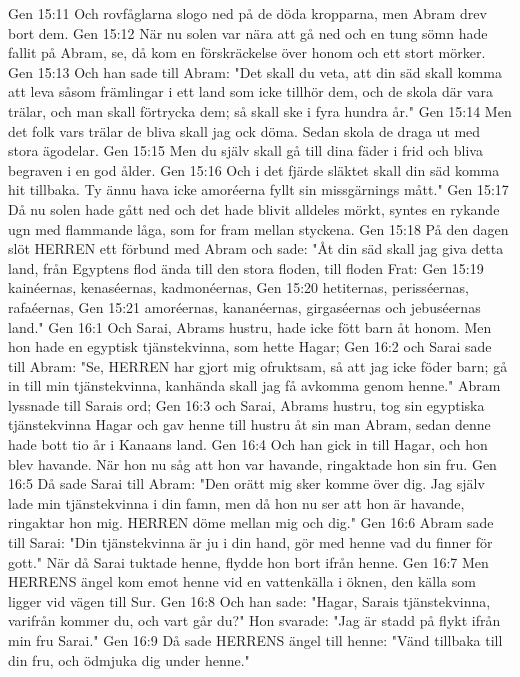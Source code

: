 Gen 15:11  Och rovfåglarna slogo ned på de döda kropparna, men Abram drev bort dem.
Gen 15:12  När nu solen var nära att gå ned och en tung sömn hade fallit på Abram, se, då kom en förskräckelse över honom och ett stort mörker.
Gen 15:13  Och han sade till Abram: "Det skall du veta, att din säd skall komma att leva såsom främlingar i ett land som icke tillhör dem, och de skola där vara trälar, och man skall förtrycka dem; så skall ske i fyra hundra år."
Gen 15:14  Men det folk vars trälar de bliva skall jag ock döma. Sedan skola de draga ut med stora ägodelar.
Gen 15:15  Men du själv skall gå till dina fäder i frid och bliva begraven i en god ålder.
Gen 15:16  Och i det fjärde släktet skall din säd komma hit tillbaka. Ty ännu hava icke amoréerna fyllt sin missgärnings mått."
Gen 15:17  Då nu solen hade gått ned och det hade blivit alldeles mörkt, syntes en rykande ugn med flammande låga, som for fram mellan styckena.
Gen 15:18  På den dagen slöt HERREN ett förbund med Abram och sade: "Åt din säd skall jag giva detta land, från Egyptens flod ända till den stora floden, till floden Frat:
Gen 15:19  kainéernas, kenaséernas, kadmonéernas,
Gen 15:20  hetiternas, perisséernas, rafaéernas,
Gen 15:21  amoréernas, kananéernas, girgaséernas och jebuséernas land."
Gen 16:1  Och Sarai, Abrams hustru, hade icke fött barn åt honom. Men hon hade en egyptisk tjänstekvinna, som hette Hagar;
Gen 16:2  och Sarai sade till Abram: "Se, HERREN har gjort mig ofruktsam, så att jag icke föder barn; gå in till min tjänstekvinna, kanhända skall jag få avkomma genom henne." Abram lyssnade till Sarais ord;
Gen 16:3  och Sarai, Abrams hustru, tog sin egyptiska tjänstekvinna Hagar och gav henne till hustru åt sin man Abram, sedan denne hade bott tio år i Kanaans land.
Gen 16:4  Och han gick in till Hagar, och hon blev havande. När hon nu såg att hon var havande, ringaktade hon sin fru.
Gen 16:5  Då sade Sarai till Abram: "Den orätt mig sker komme över dig. Jag själv lade min tjänstekvinna i din famn, men då hon nu ser att hon är havande, ringaktar hon mig. HERREN döme mellan mig och dig."
Gen 16:6  Abram sade till Sarai: "Din tjänstekvinna är ju i din hand, gör med henne vad du finner för gott." När då Sarai tuktade henne, flydde hon bort ifrån henne.
Gen 16:7  Men HERRENS ängel kom emot henne vid en vattenkälla i öknen, den källa som ligger vid vägen till Sur.
Gen 16:8  Och han sade: "Hagar, Sarais tjänstekvinna, varifrån kommer du, och vart går du?" Hon svarade: "Jag är stadd på flykt ifrån min fru Sarai."
Gen 16:9  Då sade HERRENS ängel till henne: "Vänd tillbaka till din fru, och ödmjuka dig under henne."
